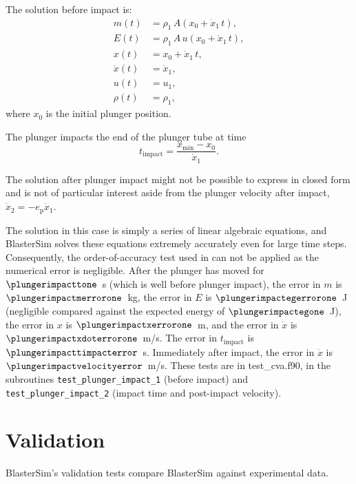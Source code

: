 The solution before impact is:
\begin{align}
    m(t)       &= \rho_1\,A (x_0 + \dot{x}_1\,t), \\
    E(t)       &= \rho_1\,A\,u (x_0 + \dot{x}_1\,t), \\
    x(t)       &= x_0 + \dot{x}_1\,t, \\
    \dot{x}(t) &= \dot{x}_1, \\
    u(t)       &= u_1, \\
    \rho(t)    &= \rho_1,
\end{align}
where $x_0$ is the initial plunger position.

The plunger impacts the end of the plunger tube at time
\begin{equation}
    t_\text{impact} = \frac{x_\text{min} - x_0}{\dot{x}_1}.
\end{equation}

The solution after plunger impact might not be possible to express in closed form and is not of particular interest aside from the plunger velocity after impact, $\dot{x}_2 = -e_\text{p} \dot{x}_1$.



The solution in this case is simply a series of linear algebraic equations, and BlasterSim solves these equations extremely accurately even for large time steps.
Consequently, the order-of-accuracy test used in  can not be applied as the numerical error is negligible.
After the plunger has moved for $\plungerimpacttone$~s (which is well before plunger impact), the error in $m$ is $\plungerimpactmerrorone$~kg, the error in $E$ is $\plungerimpactegerrorone$~J (negligible compared against the expected energy of $\plungerimpactegone$~J), the error in $x$ is $\plungerimpactxerrorone$~m, and the error in $\dot{x}$ is $\plungerimpactxdoterrorone$~m/s.
The error in $t_\text{impact}$ is $\plungerimpacttimpacterror$~s.
Immediately after impact, the error in $\dot{x}$ is $\plungerimpactvelocityerror$~m/s.
These tests are in test\_cva.f90, in the subroutines \texttt{test\_plunger\_impact\_1} (before impact) and \texttt{test\_plunger\_impact\_2} (impact time and post-impact velocity).

\section{Validation}\label{validation}

BlasterSim's validation tests compare BlasterSim against experimental data.

